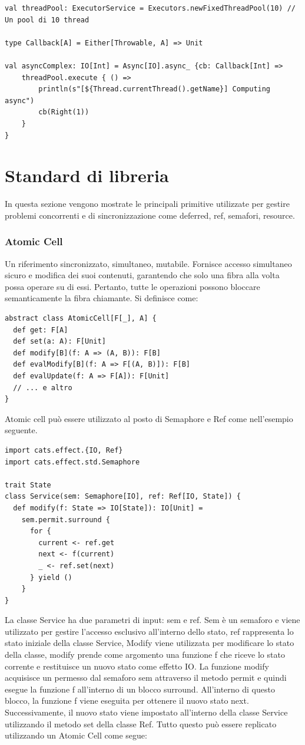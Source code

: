 \begin{verbatim}
val threadPool: ExecutorService = Executors.newFixedThreadPool(10) // Un pool di 10 thread

type Callback[A] = Either[Throwable, A] => Unit
    
val asyncComplex: IO[Int] = Async[IO].async_ {cb: Callback[Int] =>
    threadPool.execute { () =>
        println(s"[${Thread.currentThread().getName}] Computing async")
        cb(Right(1))
    }
}
\end{verbatim}

\section{Standard di libreria}
In questa sezione vengono mostrate le principali primitive utilizzate per
gestire problemi concorrenti e di sincronizzazione come deferred, ref, semafori, resource.

\subsubsection{Atomic Cell}
Un riferimento sincronizzato, simultaneo, mutabile. Fornisce accesso simultaneo sicuro e modifica dei suoi contenuti, garantendo che solo una fibra alla volta possa operare su di essi. Pertanto, tutte le operazioni possono bloccare semanticamente la fibra chiamante. Si definisce come:
\begin{verbatim}
abstract class AtomicCell[F[_], A] {
  def get: F[A]
  def set(a: A): F[Unit]
  def modify[B](f: A => (A, B)): F[B]
  def evalModify[B](f: A => F[(A, B)]): F[B]
  def evalUpdate(f: A => F[A]): F[Unit]
  // ... e altro
}
\end{verbatim}
\noindent Atomic  cell può essere utilizzato al posto di Semaphore e Ref come nell'esempio seguente.
\begin{verbatim}
import cats.effect.{IO, Ref}
import cats.effect.std.Semaphore

trait State
class Service(sem: Semaphore[IO], ref: Ref[IO, State]) {
  def modify(f: State => IO[State]): IO[Unit] = 
    sem.permit.surround {
      for {
        current <- ref.get
        next <- f(current)
        _ <- ref.set(next) 
      } yield ()
    }
}

\end{verbatim}

\noindent La classe Service ha due parametri di input: sem e ref. Sem è un semaforo e viene utilizzato per gestire l'accesso esclusivo all'interno dello stato, ref rappresenta lo stato iniziale della classe Service, Modify viene utilizzata per modificare lo stato della classe, modify prende come argomento una funzione f che riceve lo stato corrente e restituisce un nuovo stato come effetto IO. La funzione modify acquisisce un permesso dal semaforo sem attraverso il metodo permit e quindi esegue la funzione f all'interno di un blocco surround. All'interno di questo blocco, la funzione f viene eseguita per ottenere il nuovo stato next. Successivamente, il nuovo stato viene impostato all'interno della classe Service utilizzando il metodo set della classe Ref. Tutto questo può essere replicato utilizzando un Atomic Cell come segue:


